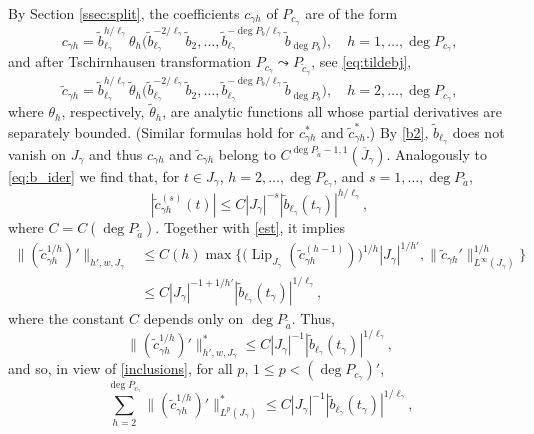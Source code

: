 \documentclass[12pt]{amsart}
\theoremstyle{plain}
\theoremstyle{definition}
\numberwithin{equation}{section}
\let\on=\operatorname
\begin{document}
By Section \ref{ssec:split}, the coefficients $c_{{\gamma} h}$ of $P_{c_{\gamma}}$ are of the form 
\[
  c_{{\gamma} h} = \tilde b_{\ell_{\gamma}}^{h/\ell_{\gamma}} 
  {\theta}_h \big(\tilde b_{\ell_{\gamma}}^{-2/\ell_{\gamma}} \tilde b_2, \ldots, \tilde b_{\ell_{\gamma}}^{-\deg P_b/\ell_{\gamma}} \tilde b_{\deg P_b}\big), 
  \quad h = 1,\ldots, \deg P_{c_{\gamma}},
\]  
and after Tschirnhausen transformation $P_{c_{\gamma}} \leadsto P_{\tilde c_{\gamma}}$, see \eqref{eq:tildebj}, 
\[
  \tilde c_{{\gamma} h} = \tilde b_{\ell_{\gamma}}^{h/\ell_{\gamma}} 
  \tilde {\theta}_h \big(\tilde b_{\ell_{\gamma}}^{-2/\ell_{\gamma}} \tilde b_2, \ldots, \tilde b_{\ell_{\gamma}}^{-\deg P_b/\ell_{\gamma}} \tilde b_{\deg P_b}\big), 
  \quad h = 2,\ldots, \deg P_{c_{\gamma}},
\] 
where ${\theta}_h$, respectively, $\tilde {\theta}_h$, are analytic functions all whose partial derivatives are separately bounded.
(Similar formulas hold for $c_{{\gamma} h}^*$ and $\tilde c_{{\gamma} h}^*$.) 
By \eqref{b2}, $\tilde b_{\ell_{\gamma}}$ does not vanish on $J_{\gamma}$ and thus $c_{{\gamma} h}$ and $\tilde c_{{\gamma} h}$ belong to 
$C^{\deg P_{\tilde a}-1,1}(\overline J_{\gamma})$.
Analogously to \eqref{eq:b_ider} we find that, for $t \in J_{\gamma}$, $h = 2,\ldots, \deg P_{c_{\gamma}}$, and $s=1,\dots,\deg P_{\tilde a}$,
\[
  |\tilde c_{{\gamma} h}^{(s)}(t) | \le C  |J_{\gamma}|^{-s}  |\tilde b_{\ell_{\gamma}} (t_{\gamma})|^{h/\ell_{\gamma}},
\]
where $C=C(\deg P_{\tilde a})$.
Together with \eqref{est}, it implies 
\begin{align*} 
\|(\tilde c_{{\gamma} h}^{1/h})'\|_{h',w,J_{\gamma}} &\le C(h) \max\Big\{\big(\on{Lip}_{J_{\gamma}}(\tilde c_{{\gamma} h}^{(h-1)})\big)^{1/h}|J_{\gamma}|^{1/h'}, 
    \|\tilde c_{{\gamma} h}'\|_{L^\infty(J_{\gamma})}^{1/h}\Big\} \\
    &\le C  |J_{\gamma}|^{-1 +1/h'} |\tilde b_{\ell_{\gamma}} (t_{\gamma})|^{1/\ell_{\gamma}},
\end{align*} 
where the constant $C$ depends only on $\deg P_{\tilde a}$.
Thus,
\begin{equation*}
  \|(\tilde c_{{\gamma} h}^{1/h})'\|^*_{h',w,J_{\gamma}} \le C  |J_{\gamma}|^{-1} |\tilde b_{\ell_{\gamma}} (t_{\gamma})|^{1/\ell_{\gamma}},
\end{equation*}
and so, in view of \eqref{inclusions}, for all $p$, $1 \le p < (\deg P_{c_{\gamma}})'$, 
\begin{equation*}
  \sum_{h=2}^{\deg P_{c_{\gamma}}} \|(\tilde c_{{\gamma} h}^{1/h})'\|^*_{L^p(J_{\gamma})} \le C  |J_{\gamma}|^{-1} |\tilde b_{\ell_{\gamma}} (t_{\gamma})|^{1/\ell_{\gamma}}, 
\end{equation*}
\end{document}
